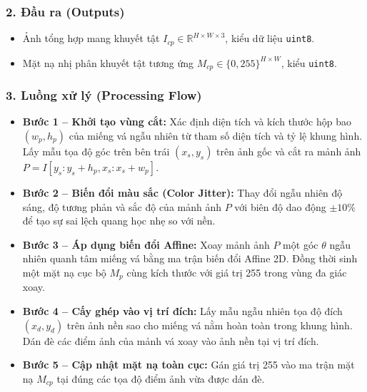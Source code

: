 \subsubsection*{2. Đầu ra (Outputs)}
\begin{itemize}
    \item Ảnh tổng hợp mang khuyết tật $I_{cp} \in \mathbb{R}^{H \times W \times 3}$, kiểu dữ liệu \texttt{uint8}.
    \item Mặt nạ nhị phân khuyết tật tương ứng $M_{cp} \in \{0, 255\}^{H \times W}$, kiểu \texttt{uint8}.
\end{itemize}

\subsubsection*{3. Luồng xử lý (Processing Flow)}
\begin{itemize}
    \item \textbf{Bước 1 -- Khởi tạo vùng cắt:} Xác định diện tích và kích thước hộp bao $(w_p, h_p)$ của miếng vá ngẫu nhiên từ tham số diện tích và tỷ lệ khung hình. Lấy mẫu tọa độ góc trên bên trái $(x_s, y_s)$ trên ảnh gốc và cắt ra mảnh ảnh $P = I[y_s:y_s+h_p, x_s:x_s+w_p]$.
    \item \textbf{Bước 2 -- Biến đổi màu sắc (Color Jitter):} Thay đổi ngẫu nhiên độ sáng, độ tương phản và sắc độ của mảnh ảnh $P$ với biên độ dao động $\pm 10\%$ để tạo sự sai lệch quang học nhẹ so với nền.
    \item \textbf{Bước 3 -- Áp dụng biến đổi Affine:} Xoay mảnh ảnh $P$ một góc $\theta$ ngẫu nhiên quanh tâm miếng vá bằng ma trận biến đổi Affine 2D. Đồng thời sinh một mặt nạ cục bộ $M_p$ cùng kích thước với giá trị 255 trong vùng đa giác xoay.
    \item \textbf{Bước 4 -- Cấy ghép vào vị trí đích:} Lấy mẫu ngẫu nhiên tọa độ đích $(x_d, y_d)$ trên ảnh nền sao cho miếng vá nằm hoàn toàn trong khung hình. Dán đè các điểm ảnh của mảnh vá xoay vào ảnh nền tại vị trí đích.
    \item \textbf{Bước 5 -- Cập nhật mặt nạ toàn cục:} Gán giá trị 255 vào ma trận mặt nạ $M_{cp}$ tại đúng các tọa độ điểm ảnh vừa được dán đè.
\end{itemize}

